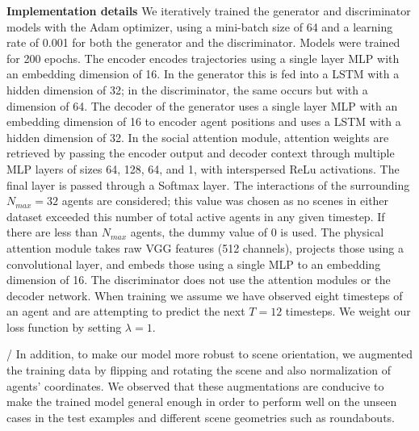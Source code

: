 \documentclass[10pt,twocolumn,letterpaper]{article}
\begin{document}
\textbf{Implementation details} We iteratively trained the generator and discriminator models with the Adam optimizer, using a mini-batch size of 64 and a learning rate of 0.001 for both the generator and the discriminator. Models were trained for 200 epochs. The encoder encodes trajectories using a single layer MLP with an embedding dimension of 16. In the generator this is fed into a LSTM with a hidden dimension of 32; in the discriminator, the same occurs but with a dimension of 64. The decoder of the generator uses a single layer MLP with an embedding dimension of 16 to encoder agent positions and uses a LSTM with a hidden dimension of 32. In the social attention module, attention weights are retrieved by passing the encoder output and decoder context through multiple MLP layers of sizes 64, 128, 64, and 1, with interspersed ReLu activations. The final layer is passed through a Softmax layer. The interactions of the surrounding $N_{max}=32$ agents are considered; this value was chosen as no scenes in either dataset exceeded this number of total active agents in any given timestep. If there are less than $N_{max}$ agents, the dummy value of 0 is used. The physical attention module takes raw VGG features (512 channels), projects those using a convolutional layer, and embeds those using a single MLP to an embedding dimension of 16. The discriminator does not use the attention modules or the decoder network. When training we assume we have observed eight timesteps of an agent and are attempting to predict the next $T=12$ timesteps. We weight our loss function by setting $\lambda=1$.

/
In addition, to make our model more robust to scene orientation, we augmented the training data by flipping and rotating the scene and also normalization of agents' coordinates. We observed that these augmentations are conducive to make the trained model general enough in order to perform well on the unseen cases in the test examples and different scene geometries such as roundabouts.
\end{document}
